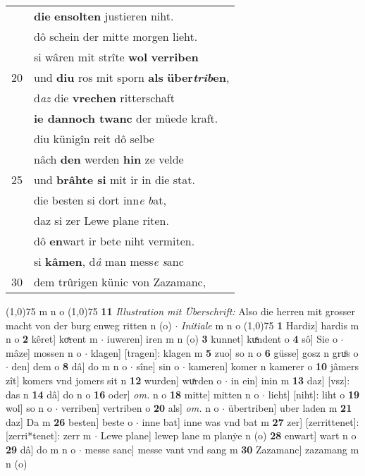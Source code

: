 \documentclass[8pt,a4paper,notitlepage]{article}
\begin{document}
\begin{table}[ht]
\begin{minipage}[t]{0.5\linewidth}
\begin{tabular}{rl}
 & \textbf{die} \textbf{en}\textbf{solten} justieren niht.\\ 
 & dô schein der mitte morgen lieht.\\ 
 & si wâren mit strîte \textbf{wol} \textbf{verriben}\\ 
20 & und \textbf{diu} ros mit sporn \textbf{als} \textbf{über\textit{trib}en},\\ 
 & d\textit{az} die \textbf{vrechen} ritterschaft\\ 
 & \textbf{ie dannoch twanc} der müede kraft.\\ 
 & diu künigîn reit dô selbe\\ 
 & nâch \textbf{den} werden \textbf{hin} ze velde\\ 
25 & und \textbf{brâhte si} mit ir in die stat.\\ 
 & die besten si dort inn\textit{e} \textit{b}at,\\ 
 & daz si zer Lewe plane riten.\\ 
 & dô \textbf{en}wart ir bete niht vermiten.\\ 
 & si \textbf{kâmen}, d\textit{â} man mess\textit{e} \textit{s}anc\\ 
30 & dem trûrigen künic von Zazamanc,\\ 
\end{tabular}
\scriptsize
\line(1,0){75} \newline
m n o \newline
\line(1,0){75} \newline
\textbf{11} \textit{Illustration mit Überschrift:} Also die herren mit grosser macht von der burg enweg ritten n (o)   $\cdot$ \textit{Initiale} m n o  \newline
\line(1,0){75} \newline
\textbf{1} Hardiz] hardis m n o \textbf{2} kêret] koͯrent m  $\cdot$ iuweren] iren m n (o) \textbf{3} kunnet] kuͯndent o \textbf{4} sô] Sie o  $\cdot$ mâze] mossen n o  $\cdot$ klagen] [tragen]: klagen m \textbf{5} zuo] so n o \textbf{6} güsse] gosz n gruͦs o  $\cdot$ den] dem o \textbf{8} dâ] do m n o  $\cdot$ sîne] sin o  $\cdot$ kameren] komer n kamerer o \textbf{10} jâmers zît] komers vnd jomers sit n \textbf{12} wurden] wuͯrden o  $\cdot$ in ein] inin m \textbf{13} daz] [vsz]: das n \textbf{14} dâ] do n o \textbf{16} oder] \textit{om.} n o \textbf{18} mitte] mitten n o  $\cdot$ lieht] [niht]: liht o \textbf{19} wol] so n o  $\cdot$ verriben] vertriben o \textbf{20} als] \textit{om.} n o  $\cdot$ übertriben] uber laden m \textbf{21} daz] Da m \textbf{26} besten] beste o  $\cdot$ inne bat] inne was vnd bat m \textbf{27} zer] [zerrittenet]: [zerri*tenet]: zerr m  $\cdot$ Lewe plane] lewep lane m planẏe n (o) \textbf{28} enwart] wart n o \textbf{29} dâ] do m n o  $\cdot$ messe sanc] messe vant vnd sang m \textbf{30} Zazamanc] zazamang m n (o) \newline
\end{minipage}
\end{table}
\end{document}

